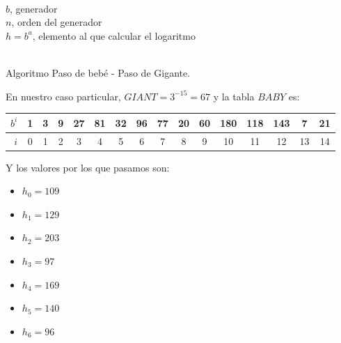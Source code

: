 	\begin{algorithm}[H]
		\begin{algorithmic}[1]
			\REQUIRE \ \\
				\texttt{$b$}, generador\\
				\texttt{$n$}, orden del generador\\
				\texttt{$h = b^a$}, elemento al que calcular el logaritmo\\ \
			\ENDFOR
			
				\ELSE
				\ENDIF
			\ENDFOR
			
		\end{algorithmic}
		\caption{Algoritmo Paso de bebé - Paso de Gigante.}
		\label{BabyGiant}
	\end{algorithm}
	
	En nuestro caso particular, $GIANT = 3^{-15} = 67$ y la tabla $BABY$ es:
	\begin{center}
	\begin{tabular}{ | r | c  c  c  c  c  c  c  c  c  c  c  c  c  c  c |}
		\hline
		$b^i$   &  1  &  3  &  9  &  27 &  81 &  32 &  96 &  77 &  20 &  60 & 180 & 118 & 143 &  7  &  21 \\
		\hline
		$i$     &  0  &  1  &  2  &  3  &  4  &  5  &  6  &  7  &  8  &  9  &  10 &  11 &  12 &  13 &  14 \\
		\hline
	\end{tabular}
	\end{center}
	
	Y los valores por los que pasamos son:
	\begin{itemize}
		\item $h_0 = 109$
		\item $h_1 = 129$
		\item $h_2 = 203$
		\item $h_3 = 97$
		\item $h_4 = 169$
		\item $h_5 = 140$
		\item $h_6 = 96$
	\end{itemize}
	

